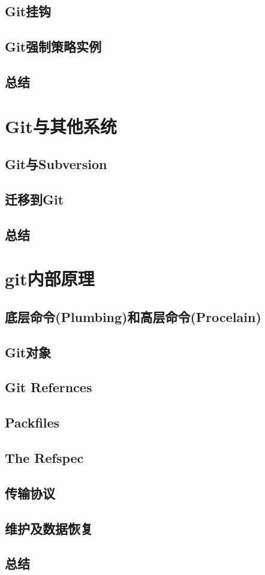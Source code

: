 \documentclass{book}
\begin{document}
	\section{Git挂钩}
	\section{Git强制策略实例}
	\section{总结}

\chapter{Git与其他系统}
	\section{Git与Subversion}
	\section{迁移到Git}
	\section{总结}
	
\chapter{git内部原理}
	\section{底层命令(Plumbing)和高层命令(Procelain)}
	\section{Git对象}
	\section{Git Refernces}
	\section{Packfiles}
	\section{The Refspec}
	\section{传输协议}
	\section{维护及数据恢复}
	\section{总结}
\end{document}

